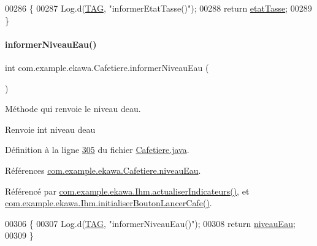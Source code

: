 \begin{DoxyCode}
00286     \{
00287         Log.d(\hyperlink{classcom_1_1example_1_1ekawa_1_1_cafetiere_aa0c1fd99a2508b06c462aea17034aa91}{TAG}, \textcolor{stringliteral}{"informerEtatTasse()"});
00288         \textcolor{keywordflow}{return} \hyperlink{classcom_1_1example_1_1ekawa_1_1_cafetiere_a93c5021591facf06397e760c11556904}{etatTasse};
00289     \}
\end{DoxyCode}
\mbox{\label{classcom_1_1example_1_1ekawa_1_1_cafetiere_ab8113e922056276f8097744991ca76b6}} 
\paragraph{\texorpdfstring{informer\+Niveau\+Eau()}{informerNiveauEau()}}
{\footnotesize\ttfamily int com.\+example.\+ekawa.\+Cafetiere.\+informer\+Niveau\+Eau (\begin{DoxyParamCaption}{ }\end{DoxyParamCaption})}



Méthode qui renvoie le niveau d\textquotesingle{}eau. 

\begin{DoxyReturn}{Renvoie}
int niveau d\textquotesingle{}eau 
\end{DoxyReturn}


Définition à la ligne \hyperlink{_cafetiere_8java_source_l00305}{305} du fichier \hyperlink{_cafetiere_8java_source}{Cafetiere.\+java}.



Références \hyperlink{_cafetiere_8java_source_l00093}{com.\+example.\+ekawa.\+Cafetiere.\+niveau\+Eau}.



Référencé par \hyperlink{_ihm_8java_source_l00855}{com.\+example.\+ekawa.\+Ihm.\+actualiser\+Indicateurs()}, et \hyperlink{_ihm_8java_source_l00526}{com.\+example.\+ekawa.\+Ihm.\+initialiser\+Bouton\+Lancer\+Cafe()}.


\begin{DoxyCode}
00306     \{
00307         Log.d(\hyperlink{classcom_1_1example_1_1ekawa_1_1_cafetiere_aa0c1fd99a2508b06c462aea17034aa91}{TAG}, \textcolor{stringliteral}{"informerNiveauEau()"});
00308         \textcolor{keywordflow}{return} \hyperlink{classcom_1_1example_1_1ekawa_1_1_cafetiere_aaf8e1a960f803c2de4defa414b5984a4}{niveauEau};
00309     \}
\end{DoxyCode}
\mbox{\label{classcom_1_1example_1_1ekawa_1_1_cafetiere_a6c708e64b24c32926eb787c3e7b8645a}} 
